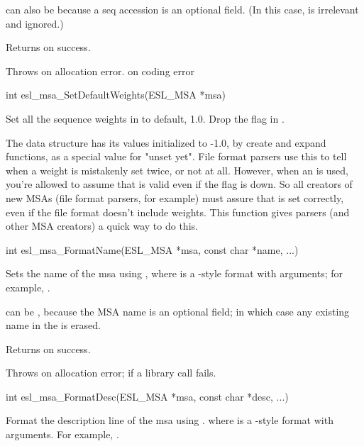 \begin{sreapi}
 can also be  because a seq accession is an
optional field. (In this case,  is irrelevant and
ignored.)

Returns  on success.

Throws  on allocation error.
 on coding error


\hypertarget{func:esl_msa_SetDefaultWeights()}
{\item[int esl\_msa\_SetDefaultWeights(ESL\_MSA *msa)]}

Set all the sequence weights in  to default,
1.0. Drop the  flag in .

The  data structure has its  values
initialized to -1.0, by create and expand functions, as
a special value for "unset yet". File format parsers use
this to tell when a weight is mistakenly set twice, or
not at all. However, when an  is used, you're
allowed to assume that  is valid even if the
 flag is down. So all creators of new
MSAs (file format parsers, for example) must assure that
 is set correctly, even if the file format
doesn't include weights. This function gives parsers
(and other MSA creators) a quick way to do this.


\hypertarget{func:esl_msa_FormatName()}
{\item[int esl\_msa\_FormatName(ESL\_MSA *msa, const char *name, ...)]}

Sets the name of the msa  using , where 
 is a -style format with
arguments; for example, .

 can be , because the MSA name is an
optional field; in which case any existing name in
the  is erased.

Returns  on success.

Throws  on allocation error;
 if a  library call fails.


\hypertarget{func:esl_msa_FormatDesc()}
{\item[int esl\_msa\_FormatDesc(ESL\_MSA *msa, const char *desc, ...)]}

Format the description line of the msa  using .
where  is a -style format with
arguments.
For example, .


\end{sreapi}
